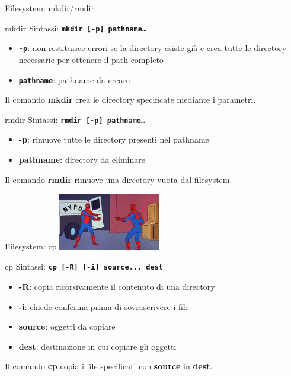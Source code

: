 \documentclass{beamer}
\begin{document}
    \begin{frame}{Filesystem: mkdir/rmdir}
        \begin{block}{mkdir}
            \small
            Sintassi: \texttt{\textbf{mkdir [-p] pathname\dots}}

            \begin{itemize}
                \item \texttt{\textbf{-p}}: non restituisce errori se la directory esiste già e crea tutte le directory necessarie per ottenere il path completo
                \item \texttt{\textbf{pathname}}: pathname da creare
            \end{itemize}

            Il comando \textbf{mkdir} crea le directory specificate mediante i parametri.
        \end{block}

        \begin{block}{rmdir}
            \small
            Sintassi: \texttt{\textbf{rmdir [-p] pathname\dots}}

            \begin{itemize}
                \item \textbf{-p}: rimuove tutte le directory presenti nel pathname
                \item \textbf{pathname}: directory da eliminare
            \end{itemize}

            Il comando \textbf{rmdir} rimuove una directory vuota dal filesystem.
        \end{block}
    \end{frame}

    \begin{frame}{Filesystem: cp}
        \centering
        \includegraphics[height=2.5cm, keepaspectratio]{images/spider-man-meme.jpg}

        \begin{block}{cp}
            \small
            Sintassi: \texttt{\textbf{cp [-R] [-i] source... dest}}

            \begin{itemize}
                \item \textbf{-R}: copia ricorsivamente il contenuto di una directory
                \item \textbf{-i}: chiede conferma prima di sovrascrivere i file
                \item \textbf{source}: oggetti da copiare
                \item \textbf{dest}: destinazione in cui copiare gli oggetti
            \end{itemize}

            Il comando \textbf{cp} copia i file specificati con \textbf{source} in \textbf{dest}.
        \end{block}
    \end{frame}
\end{document}
